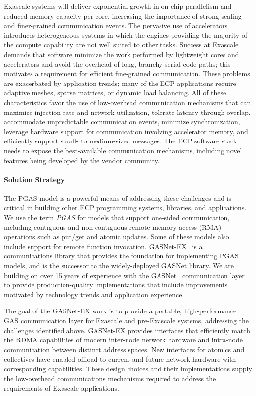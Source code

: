 Exascale systems will deliver exponential growth in on-chip parallelism and
reduced memory capacity per core, 
increasing the importance of strong
scaling and finer-grained communication events.  
The pervasive use of accelerators introduces heterogeneous systems in which
the engines providing the majority of the compute capability are not well
suited to other tasks.
Success at Exascale demands that
software minimize the work performed by lightweight cores and accelerators and avoid the
overhead of long, branchy serial code paths; 
this motivates a requirement for efficient
fine-grained communication.
These problems are exacerbated by application trends; many of the ECP applications require
adaptive meshes, sparse matrices,
or dynamic load balancing.
All of these characteristics favor the use of
low-overhead communication mechanisms that
can maximize injection rate and network utilization, tolerate latency through
overlap, accommodate unpredictable communication events, minimize synchronization,
leverage hardware support for communication involving accelerator memory,
and efficiently support small- to medium-sized messages. The ECP software stack
needs to expose the best-available communication mechanisms, including novel
features being developed by the vendor community.

\paragraph{Solution Strategy}

The PGAS model is a powerful means of addressing these
challenges and is critical in building other ECP programming systems,
libraries, and applications.  We use the term {\em PGAS} for models that support
one-sided communication, 
including contiguous and non-contiguous remote memory access (RMA) operations such as put/get
and atomic updates. Some of these models also include support for remote function invocation.
GASNet-EX~\cite{gasnet-lcpc18} is a communications library that provides the foundation for implementing
PGAS models, and is the successor to the widely-deployed GASNet library.
We are building on over 15 years of experience with the GASNet~\cite{gasnet-spec,gasnet-site}
communication layer to provide production-quality implementations that include
improvements motivated by
technology trends and application experience.  

The goal of the GASNet-EX work is to provide a portable, high-performance GAS
communication layer for Exascale and pre-Exascale systems, addressing the challenges
identified above.
GASNet-EX provides interfaces that efficiently match the RDMA capabilities of modern
inter-node network hardware and intra-node communication between distinct address spaces.
New interfaces for atomics and collectives have enabled offload to current
and future network hardware with corresponding capabilities.
These design choices and their implementations supply the low-overhead communications
mechanisms required to address the requirements of Exascale applications.

